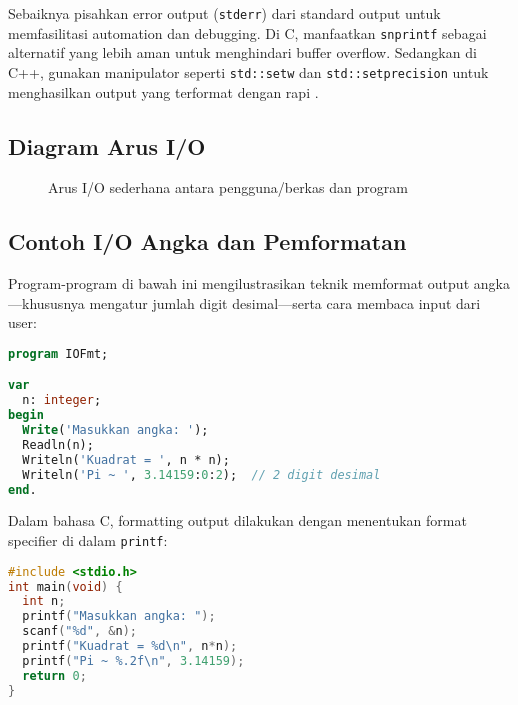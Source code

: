 \documentclass[../main.tex]{subfiles}
\begin{document}
Sebaiknya pisahkan error output (\texttt{stderr}) dari standard output untuk memfasilitasi automation dan debugging. Di C, manfaatkan \texttt{snprintf} sebagai alternatif yang lebih aman untuk menghindari buffer overflow. Sedangkan di C++, gunakan manipulator seperti \texttt{std::setw} dan \texttt{std::setprecision} untuk menghasilkan output yang terformat dengan rapi \parencite{gnu-c-manual,cpp-reference,cpp-iomanip}.

\subsection{Diagram Arus I/O}
\begin{figure}[H]
  \centering
  \caption{Arus I/O sederhana antara pengguna/berkas dan program}
  \label{fig:io-flow}
\end{figure}

\subsection{Contoh I/O Angka dan Pemformatan}

Program-program di bawah ini mengilustrasikan teknik memformat output angka—khususnya mengatur jumlah digit desimal—serta cara membaca input dari user:

\begin{lstlisting}[language=Pascal, caption={Baca integer dan format keluaran (Pascal)}]
program IOFmt;

var
  n: integer;
begin
  Write('Masukkan angka: ');
  Readln(n);
  Writeln('Kuadrat = ', n * n);
  Writeln('Pi ~ ', 3.14159:0:2);  // 2 digit desimal
end.
\end{lstlisting}

Dalam bahasa C, formatting output dilakukan dengan menentukan format specifier di dalam \texttt{printf}:

\begin{lstlisting}[language=C, caption={Baca integer dan format keluaran (C)}]
#include <stdio.h>
int main(void) {
  int n;
  printf("Masukkan angka: ");
  scanf("%d", &n);
  printf("Kuadrat = %d\n", n*n);
  printf("Pi ~ %.2f\n", 3.14159);
  return 0;
}
\end{lstlisting}
\end{document}
